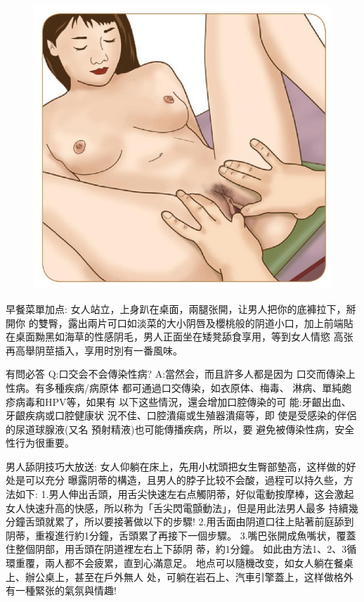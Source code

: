 \documentclass[12pt,UTF8]{ctexbook}
\begin{document}
\begin{figure}[htbp]
	\centering
	\includegraphics[width=0.7\linewidth]{23}
	\caption{}
	\label{fig:1}
\end{figure}

早餐菜單加点:
女人站立，上身趴在桌面，兩腿张開，让男人把你的底褲拉下，掰開你
的雙臀，露出兩片可口如淡菜的大小阴唇及櫻桃般的阴道小口，加上前端貼
在桌面黝黑如海草的性感阴毛，男人正面坐在矮凳舔食享用，等到女人情慾
高张再高舉阴莖插入，享用时別有一番風味。

有問必答
Q:口交会不会傳染性病?
A:當然会，而且許多人都是因为
口交而傳染上性病。有多種疾病/病原体
都可通過口交傳染，如衣原体、梅毒、
淋病、單純皰疹病毒和HPV等，如果有
以下这些情況，還会增加口腔傳染的可
能:牙齦出血、牙齦疾病或口腔健康状
況不佳、口腔潰瘍或生殖器潰瘍等，即
使是受感染的伴侶的尿道球腺液(又名
預射精液)也可能傳播疾病，所以，要
避免被傳染性病，安全性行为很重要。

男人舔阴技巧大放送:
女人仰躺在床上，先用小枕頭把女生臀部墊高，这样做的好处是可以充分
曝露阴蒂的構造，且男人的脖子比较不会酸，過程可以持久些，方法如下:
1.男人伸出舌頭，用舌尖快速左右点觸阴蒂，好似電動按摩棒，这会激起
女人快速升高的快感，所以称为「舌尖閃電顫動法」，但是用此法男人最多
持續幾分鐘舌頭就累了，所以要接著做以下的步驟!
2.用舌面由阴道口往上貼著前庭舔到阴蒂，重複進行約1分鐘，舌頭累了再接下一個步驟。
3.嘴巴张開成魚嘴状，覆蓋住整個阴部，用舌頭在阴道裡左右上下舔阴
蒂，約1分鐘。
如此由方法1、2、3循環重覆，兩人都不会疲累，直到心滿意足。
地点可以隨機改变，如女人躺在餐桌上、辦公桌上，甚至在戶外無人
处，可躺在岩石上、汽車引擎蓋上，这样做格外有一種緊张的氣氛與情趣!
\end{document}
